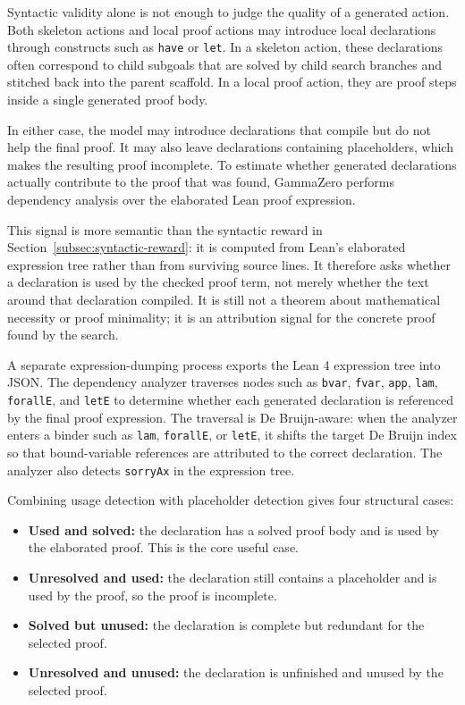 Syntactic validity alone is not enough to judge the quality of a generated action. Both skeleton actions
and local proof actions may introduce local declarations through constructs such as \texttt{have} or
\texttt{let}. In a skeleton action, these declarations often correspond to child subgoals that are solved by
child search branches and stitched back into the parent scaffold. In a local proof action, they are proof
steps inside a single generated proof body.

In either case, the model may introduce declarations that compile but do not help the final proof. It may
also leave declarations containing placeholders, which makes the resulting proof incomplete. To estimate
whether generated declarations actually contribute to the proof that was found, GammaZero performs
dependency analysis over the elaborated Lean proof expression.

This signal is more semantic than the syntactic reward in Section~\ref{subsec:syntactic-reward}: it is computed
from Lean's elaborated expression tree rather than from surviving source lines. It therefore asks whether
a declaration is used by the checked proof term, not merely whether the text around that declaration
compiled. It is still not a theorem about mathematical necessity or proof minimality; it is an attribution
signal for the concrete proof found by the search.

A separate expression-dumping process exports the Lean 4 expression tree into JSON. The dependency
analyzer traverses nodes such as \texttt{bvar}, \texttt{fvar}, \texttt{app}, \texttt{lam}, \texttt{forallE}, and
\texttt{letE} to determine whether each generated declaration is referenced by the final proof expression.
The traversal is De Bruijn-aware: when the analyzer enters a binder such as \texttt{lam}, \texttt{forallE},
or \texttt{letE}, it shifts the target De Bruijn index so that bound-variable references are attributed to
the correct declaration. The analyzer also detects \texttt{sorryAx} in the expression tree.

Combining usage detection with placeholder detection gives four structural cases:
\begin{itemize}
    \item \textbf{Used and solved:} the declaration has a solved proof body and is used by the elaborated proof. This is the core useful case.
    \item \textbf{Unresolved and used:} the declaration still contains a placeholder and is used by the proof, so the proof is incomplete.
    \item \textbf{Solved but unused:} the declaration is complete but redundant for the selected proof.
    \item \textbf{Unresolved and unused:} the declaration is unfinished and unused by the selected proof.
\end{itemize}

